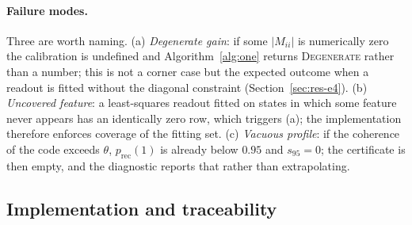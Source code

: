 \documentclass[preprint,12pt]{elsarticle}
\theoremstyle{definition}
\begin{document}
\paragraph{Failure modes.} Three are worth naming. (a) \emph{Degenerate gain}: if some
$|M_{ii}|$ is numerically zero the calibration is undefined and Algorithm~\ref{alg:one}
returns \textsc{Degenerate} rather than a number; this is not a corner case but the expected
outcome when a readout is fitted without the diagonal constraint
(Section~\ref{sec:res-e4}). (b) \emph{Uncovered feature}: a least-squares readout fitted on
states in which some feature never appears has an identically zero row, which triggers (a);
the implementation therefore enforces coverage of the fitting set. (c) \emph{Vacuous profile}:
if the coherence of the code exceeds $\theta$, $p_{\mathrm{rec}}(1)$ is already below $0.95$
and $s_{95}=0$; the certificate is then empty, and the diagnostic reports that rather than
extrapolating.

\subsection{Implementation and traceability}
\end{document}
